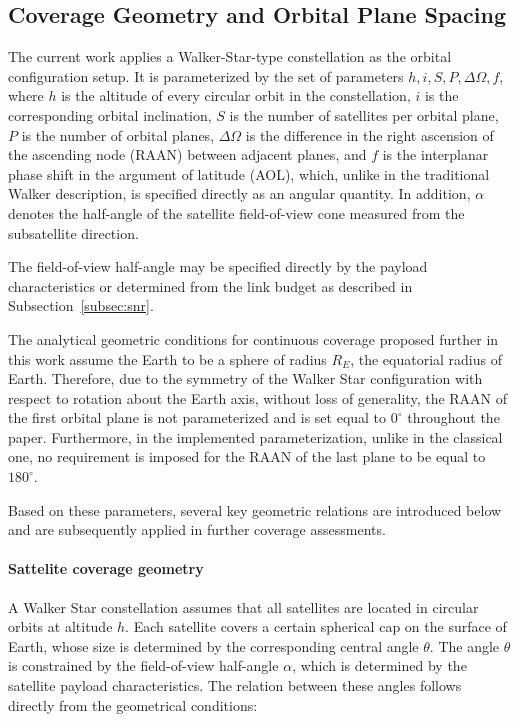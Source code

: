 \subsection{Coverage Geometry and Orbital Plane Spacing}
\label{subsec:parameterization}

The current work applies a Walker-Star-type constellation \cite{walker1971, wertz2001ocdm} as the orbital configuration setup. 
It is parameterized by the set of parameters $h, i, S, P, \Delta\Omega, f$, where $h$ is the altitude 
of every circular orbit in the constellation, $i$ is the corresponding orbital inclination, 
$S$ is the number of satellites per orbital plane, $P$ is the number of orbital planes, $\Delta\Omega$ 
is the difference in the right ascension of the ascending node (RAAN) between adjacent planes, 
and $f$ is the interplanar phase shift in the argument of latitude (AOL), which, unlike in the 
traditional Walker description, is specified directly as an angular quantity. In addition, 
$\alpha$ denotes the half-angle of the satellite field-of-view cone measured from the 
subsatellite direction.

The field-of-view half-angle may be specified directly by the payload characteristics
or determined from the link budget as described in Subsection~\ref{subsec:snr}.

The analytical geometric conditions for continuous coverage proposed further in this work assume 
the Earth to be a sphere of radius $R_E$, the equatorial radius of Earth. Therefore, due to the 
symmetry of the Walker Star configuration with respect to rotation about the Earth axis, without loss 
of generality, the RAAN of the first orbital plane is not parameterized and is set equal to $0^\circ$ 
throughout the paper. Furthermore, in the implemented parameterization, unlike in the classical one, 
no requirement is imposed for the RAAN of the last plane to be equal to $180^\circ$.

Based on these parameters, several key geometric relations are introduced below 
and are subsequently applied in further coverage assessments.

\paragraph{Sattelite coverage geometry}
A Walker Star constellation assumes that all satellites are located in circular orbits 
at altitude $h$. Each satellite covers a certain spherical cap on the surface of Earth, 
whose size is determined by the corresponding central angle $\theta$. The angle $\theta$ is 
constrained by the field-of-view half-angle $\alpha$, which is determined by the satellite payload 
characteristics. The relation between these angles follows directly from the geometrical conditions:

